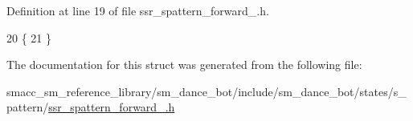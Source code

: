Definition at line 19 of file ssr\+\_\+spattern\+\_\+forward\+\_.\+h.


\begin{DoxyCode}
20   \{
21   \}
\end{DoxyCode}


The documentation for this struct was generated from the following file\+:\begin{DoxyCompactItemize}
\item 
smacc\+\_\+sm\+\_\+reference\+\_\+library/sm\+\_\+dance\+\_\+bot/include/sm\+\_\+dance\+\_\+bot/states/s\+\_\+pattern/\hyperlink{ssr__spattern__forward__3_8h}{ssr\+\_\+spattern\+\_\+forward\+\_.\+h}\end{DoxyCompactItemize}
